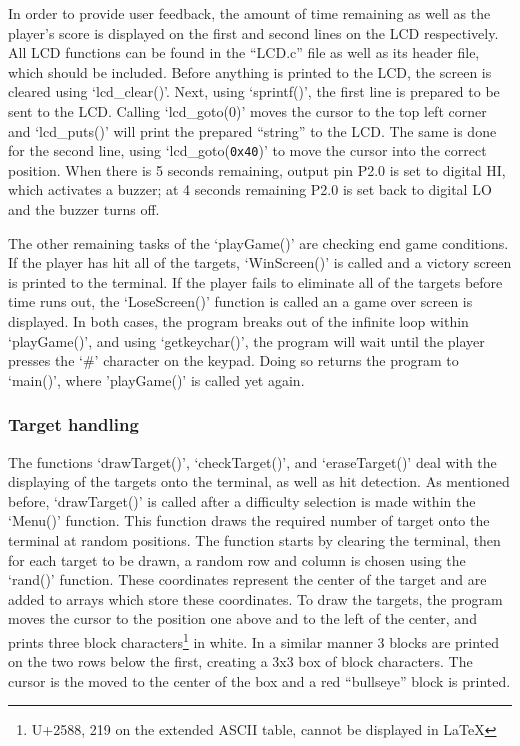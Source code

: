 \documentclass[12pt]{article}
\begin{document}
In order to provide user feedback, the amount of time remaining as well as the player's score is displayed on the first and second lines on the LCD respectively. All LCD functions can be found in the ``LCD.c'' file as well as its header file, which should be included. Before anything is printed to the LCD, the screen is cleared using `lcd\_clear()'. Next, using `sprintf()', the first line is prepared to be sent to the LCD. Calling `lcd\_goto(0)' moves the cursor to the top left corner and `lcd\_puts()' will print the prepared ``string'' to the LCD. The same is done for the second line, using `lcd\_goto(\texttt{0x40})' to move the cursor into the correct position. When there is 5 seconds remaining, output pin P2.0 is set to digital HI, which activates a buzzer; at 4 seconds remaining P2.0 is set back to digital LO and the buzzer turns off. 

The other remaining tasks of the `playGame()' are checking end game conditions. If the player has hit all of the targets, `WinScreen()' is called and a victory screen is printed to the terminal. If the player fails to eliminate all of the targets before time runs out, the `LoseScreen()' function is called an a game over screen is displayed. In both cases, the program breaks out of the infinite loop within `playGame()', and using `getkeychar()', the program will wait until the player presses the `\#' character on the keypad. Doing so returns the program to `main()', where 'playGame()' is called yet again. 

\subsubsection{Target handling}
The functions `drawTarget()', `checkTarget()', and `eraseTarget()' deal with the displaying of the targets onto the terminal, as well as hit detection. As mentioned before, `drawTarget()' is called after a difficulty selection is made within the `Menu()' function. This function draws the required number of target onto the terminal at random positions. The function starts by clearing the terminal, then for each target to be drawn, a random row and column is chosen using the `rand()' function. These coordinates represent the center of the target and are added to arrays which store these coordinates. To draw the targets, the program moves the cursor to the position one above and to the left of the center, and prints three block characters\footnote{U+2588, 219 on the extended ASCII table, cannot be displayed in \LaTeX} in white. In a similar manner 3 blocks are printed on the two rows below the first, creating a 3x3 box of block characters. The cursor is the moved to the center of the box and a red ``bullseye'' block is printed. 
\end{document}

